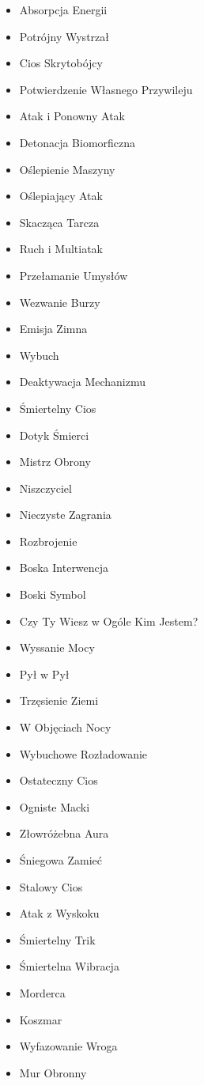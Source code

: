 \begin{itemize}
\item Absorpcja Energii
\item Potrójny Wystrzał
\item Cios Skrytobójcy
\item Potwierdzenie Własnego Przywileju
\item Atak i Ponowny Atak
\item Detonacja Biomorficzna
\item Oślepienie Maszyny
\item Oślepiający Atak
\item Skacząca Tarcza
\item Ruch i Multiatak
\item Przełamanie Umysłów
\item Wezwanie Burzy
\item Emisja Zimna
\item Wybuch
\item Deaktywacja Mechanizmu
\item Śmiertelny Cios
\item Dotyk Śmierci
\item Mistrz Obrony
\item Niszczyciel
\item Nieczyste Zagrania
\item Rozbrojenie
\item Boska Interwencja
\item Boski Symbol
\item Czy Ty Wiesz w Ogóle Kim Jestem?
\item Wyssanie Mocy
\item Pył w Pył
\item Trzęsienie Ziemi
\item W Objęciach Nocy
\item Wybuchowe Rozładowanie
\item Ostateczny Cios
\item Ogniste Macki
\item Złowróżebna Aura
\item Śniegowa Zamieć
\item Stalowy Cios
\item Atak z Wyskoku
\item Śmiertelny Trik
\item Śmiertelna Wibracja
\item Morderca
\item Koszmar
\item Wyfazowanie Wroga
\item Mur Obronny

\end{itemize}
